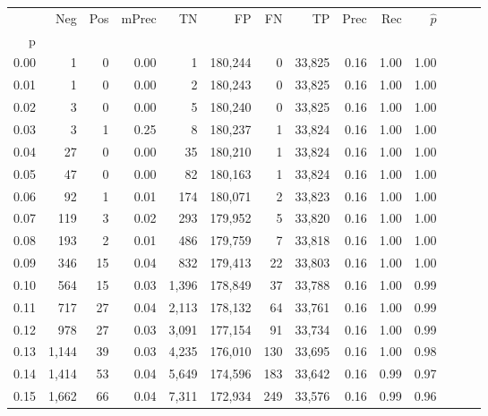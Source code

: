 \begin{tabular}{rrrrrrrrrrrrrr}
\toprule
{} &    Neg &  Pos & mPrec &       TN &       FP &      FN &      TP &  Prec &   Rec & $\hat{p}$ \\
p    &        &      &       &          &          &         &         &       &       &           \\
\midrule
0.00 &      1 &    0 &  0.00 &        1 &  180,244 &       0 &  33,825 &  0.16 &  1.00 &      1.00 \\
0.01 &      1 &    0 &  0.00 &        2 &  180,243 &       0 &  33,825 &  0.16 &  1.00 &      1.00 \\
0.02 &      3 &    0 &  0.00 &        5 &  180,240 &       0 &  33,825 &  0.16 &  1.00 &      1.00 \\
0.03 &      3 &    1 &  0.25 &        8 &  180,237 &       1 &  33,824 &  0.16 &  1.00 &      1.00 \\
0.04 &     27 &    0 &  0.00 &       35 &  180,210 &       1 &  33,824 &  0.16 &  1.00 &      1.00 \\
0.05 &     47 &    0 &  0.00 &       82 &  180,163 &       1 &  33,824 &  0.16 &  1.00 &      1.00 \\
0.06 &     92 &    1 &  0.01 &      174 &  180,071 &       2 &  33,823 &  0.16 &  1.00 &      1.00 \\
0.07 &    119 &    3 &  0.02 &      293 &  179,952 &       5 &  33,820 &  0.16 &  1.00 &      1.00 \\
0.08 &    193 &    2 &  0.01 &      486 &  179,759 &       7 &  33,818 &  0.16 &  1.00 &      1.00 \\
0.09 &    346 &   15 &  0.04 &      832 &  179,413 &      22 &  33,803 &  0.16 &  1.00 &      1.00 \\
0.10 &    564 &   15 &  0.03 &    1,396 &  178,849 &      37 &  33,788 &  0.16 &  1.00 &      0.99 \\
0.11 &    717 &   27 &  0.04 &    2,113 &  178,132 &      64 &  33,761 &  0.16 &  1.00 &      0.99 \\
0.12 &    978 &   27 &  0.03 &    3,091 &  177,154 &      91 &  33,734 &  0.16 &  1.00 &      0.99 \\
0.13 &  1,144 &   39 &  0.03 &    4,235 &  176,010 &     130 &  33,695 &  0.16 &  1.00 &      0.98 \\
0.14 &  1,414 &   53 &  0.04 &    5,649 &  174,596 &     183 &  33,642 &  0.16 &  0.99 &      0.97 \\
0.15 &  1,662 &   66 &  0.04 &    7,311 &  172,934 &     249 &  33,576 &  0.16 &  0.99 &      0.96 \\

\end{tabular}

